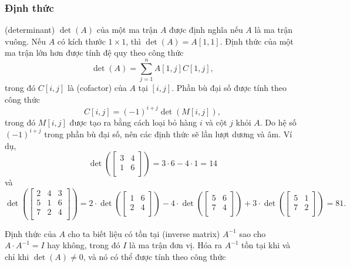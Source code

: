 \subsubsection{Định thức}


 (determinant) $\det(A)$ của một ma trận $A$
được định nghĩa nếu $A$ là ma trận vuông.
Nếu $A$ có kích thước $1 \times 1$,
thì $\det(A)=A[1,1]$.
Định thức của một ma trận lớn hơn được 
tính đệ quy theo công thức  
\[\det(A)=\sum_{j=1}^n A[1,j] C[1,j],\]
trong đó $C[i,j]$ là  (cofactor) của $A$
tại $[i,j]$.
Phần bù đại số được tính theo công thức
\[C[i,j] = (-1)^{i+j} \det(M[i,j]),\]
trong đó $M[i,j]$ được tạo ra bằng cách loại bỏ
hàng $i$ và cột $j$ khỏi $A$.
Do hệ số $(-1)^{i+j}$ trong phần bù đại số,
nên các định thức sẽ lần lượt dương
và âm.
Ví dụ,
\[
\det(
 \begin{bmatrix}
  3 & 4 \\
  1 & 6 \\
 \end{bmatrix}
) = 3 \cdot 6 - 4 \cdot 1 = 14 
\]
và
\[
\det(
 \begin{bmatrix}
  2 & 4 & 3 \\
  5 & 1 & 6 \\
  7 & 2 & 4 \\
 \end{bmatrix}
) = 
2 \cdot
\det(
 \begin{bmatrix}
  1 & 6 \\
  2 & 4 \\
 \end{bmatrix}
)
-4 \cdot
\det(
 \begin{bmatrix}
  5 & 6 \\
  7 & 4 \\
 \end{bmatrix}
)
+3 \cdot
\det(
 \begin{bmatrix}
  5 & 1 \\
  7 & 2 \\
 \end{bmatrix}
) = 81.
\]


Định thức của $A$ cho ta biết
liệu có tồn tại  (inverse matrix)
$A^{-1}$ sao cho $A \cdot A^{-1} = I$ hay không,
trong đó $I$ là ma trận đơn vị.
Hóa ra $A^{-1}$ tồn tại
khi và chỉ khi $\det(A) \neq 0$,
và nó có thể được tính theo công thức

